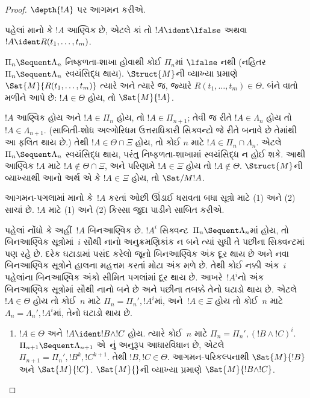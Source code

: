 \begin{proof}
  $\depth{!A}$
  પર આગમન
  કરીએ.

પહેલાં માનો કે
$!A$ આણ્વિક છે,
એટલે કાં તો
$!A \ident \lfalse$
અથવા
$!A
\ident R(t_1, \dots, t_m)$.

$\Pi_n \Sequent \Lambda_n$
નિષ્ફળતા-શાખા
હોવાથી કોઈ
$\Pi_n$માં
$\lfalse$ નથી
(નહિતર
$\Pi_n \Sequent \Lambda_n$
સ્વયંસિદ્ધ
થાય).
$\Struct{M}$ની
વ્યાખ્યા પ્રમાણે
$\Sat{M}{R(t_1, \dots, t_m)}$
ત્યારે અને
ત્યારે જ,
જ્યારે
$R(t_1, \dots, t_m) \in
\Theta$.
બંને વાતો
મળીને આપે છે:
$!A \in
\Theta$ હોય,
તો
$\Sat{M}{!A}$.

$!A$ આણ્વિક
હોય અને
$!A \in \Pi_n$
હોય, તો
$!A \in \Pi_{n+1}$;
તેવી જ રીતે
$!A \in \Lambda_n$
હોય તો
$!A \in \Lambda_{n+1}$.
(સાબિતી-શોધ
અલ્ગોરિધમ
ઉત્તરાધિકારી
સિક્વન્ટો જે
રીતે બનાવે
છે તેમાંથી
આ ફલિત થાય
છે.) તેથી
$!A \in \Theta \cap \Xi$
હોય, તો કોઈ
$n$ માટે
$!A \in \Pi_n \cap
\Lambda_n$.
એટલે
$\Pi_n \Sequent \Lambda_n$
સ્વયંસિદ્ધ
થાય, પરંતુ
નિષ્ફળતા-શાખામાં
સ્વયંસિદ્ધ ન
હોઈ શકે.
આથી આણ્વિક
$!A$ માટે
$!A \notin \Theta
\cap \Xi$,
અને પરિણામે
$!A \in \Xi$
હોય તો
$!A \notin \Theta$.
$\Struct{M}$ની
વ્યાખ્યાથી
આનો અર્થ
એ કે
$!A \in \Xi$
હોય, તો
$\Sat/{M}{!A}$.

આગમન-પગલામાં
માનો કે~$!A$
કરતાં ઓછી
ઊંડાઈ ધરાવતા
બધા સૂત્રો
માટે (1)
અને (2)
સાચાં છે.
$!A$ માટે
(1) અને
(2) કિસ્સા
જુદા પાડીને
સાબિત કરીએ.

પહેલાં નોંધો કે અહીં~$!A$ બિનઆણ્વિક છે.
$!A^i$ સિક્વન્ટ~$\Pi_n\Sequent\Lambda_n$માં
હોય, તો બિનઆણ્વિક સૂત્રોમાં~$i$ સૌથી નાનો
અનુક્રમણિકાંક ન બને ત્યાં સુધી તે પછીના સિક્વન્ટમાં
પણ રહે છે. દરેક ઘટાડામાં પસંદ કરેલો જૂનો
બિનઆણ્વિક અંક દૂર થાય છે અને નવા બિનઆણ્વિક
સૂત્રોને હાલના મહત્તમ કરતાં મોટા અંક મળે છે.
તેથી કોઈ નક્કી અંક~$i$ પહેલાંના બિનઆણ્વિક અંકો
સીમિત પગલાંમાં દૂર થાય છે. આખરે~$!A^i$નો અંક
બિનઆણ્વિક સૂત્રોમાં સૌથી નાનો બને છે અને પછીના
તબક્કે તેનો ઘટાડો થાય છે. એટલે~$!A\in\Theta$
હોય તો કોઈ~$n$ માટે $\Pi_n=\Pi_n',!A^i$માં,
અને~$!A\in\Xi$ હોય તો કોઈ~$n$ માટે
$\Lambda_n=\Lambda_n',!A^i$માં, તેનો ઘટાડો થાય છે.

\begin{enumerate}
  \item $!A \in \Theta$
  અને
  $!A \ident !B \land !C$
  હોય. ત્યારે
  કોઈ~$n$ માટે
  $\Pi_n = \Pi_n', (!B \land !C)^i$.
  $\Pi_{n+1} \Sequent
  \Lambda_{n+1}$
  એ~\LeftR{\land}નું
  અનુરૂપ
  આધારવિધાન
  છે, એટલે
  $\Pi_{n+1} = \Pi_n', !B^k, !C^{k+1}$.
  તેથી
  $!B, !C \in
  \Theta$.
  આગમન-પરિકલ્પનાથી
  $\Sat{M}{!B}$
  અને
  $\Sat{M}{!C}$.
  $\Sat{M}{}$ની
  વ્યાખ્યા પ્રમાણે
  $\Sat{M}{!B \land !C}$.


\end{enumerate}
\end{proof}
